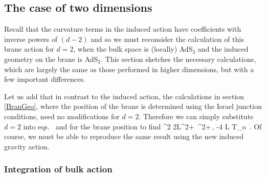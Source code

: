 %

\subsection{The case of two dimensions}\label{sec:two-d}

Recall that the curvature terms in the induced action  have coefficients with inverse powers of $(d-2)$ and so we must reconsider the calculation of this brane action for $d=2$, \ie when the bulk space is (locally) AdS$_3$ and the induced geometry on the brane is AdS$_2$. This section sketches the necessary calculations, which are largely the same as those performed in higher dimensions, but with a few important differences.

Let us add that in contrast to the induced action, the calculations in section \ref{BranGeo}, where the position of the brane is determined using the Israel junction conditions, need no modifications for $d=2$.
Therefore we can simply substitute $d=2$ into eqs.~ and  for the brane position to find
\beq\label{2dposition}
\s^2 \simeq 2L^2\veps+ \,\veps^2+\cdots\,, \quad
{}-4 \pi \Gbk L T_o \,.
\eeq
Of course, we must be able to reproduce the same result using the new induced gravity action.


\subsubsection*{Integration of bulk action}

